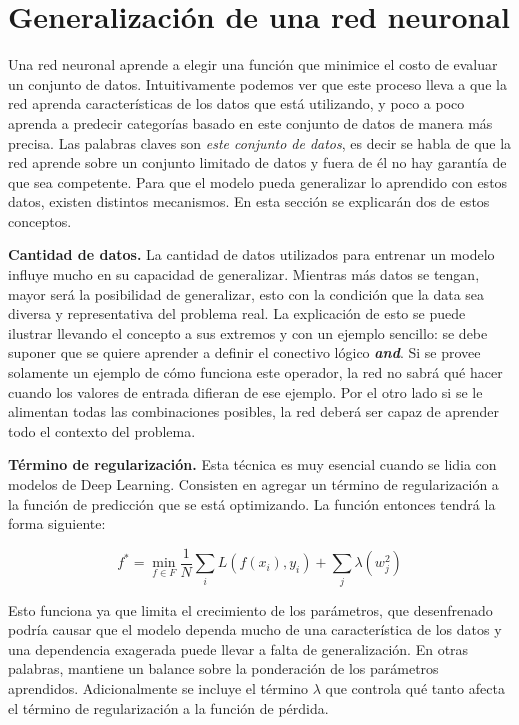 \section{Generalización de una red neuronal}

Una red neuronal aprende a elegir una función que minimice el costo de evaluar un conjunto de datos. Intuitivamente podemos ver que este proceso lleva a que la red aprenda características de los datos que está utilizando, y poco a poco aprenda a predecir categorías basado en este conjunto de datos de manera más precisa. Las palabras claves son \textit{este conjunto de datos}, es decir se habla de que la red aprende sobre un conjunto limitado de datos y fuera de él no hay garantía de que sea competente. Para que el modelo pueda generalizar lo aprendido con estos datos, existen distintos mecanismos. En esta sección se explicarán dos de estos conceptos.

\textbf{Cantidad de datos.} La cantidad de datos utilizados para entrenar un modelo influye mucho en su capacidad de generalizar. Mientras más datos se tengan, mayor será la posibilidad de generalizar, esto con la condición que la data sea diversa y representativa del problema real. La explicación de esto se puede ilustrar llevando el concepto a sus extremos y con un ejemplo sencillo: se debe suponer que se quiere aprender a definir el conectivo lógico \textbf{\textit{and}}. Si se provee solamente un ejemplo de cómo funciona este operador, la red no sabrá qué hacer cuando los valores de entrada difieran de ese ejemplo. Por el otro lado si se le alimentan todas las combinaciones posibles, la red deberá ser capaz de aprender todo el contexto del problema.

\textbf{Término de regularización.} Esta técnica es muy esencial cuando se lidia con modelos de Deep Learning. Consisten en agregar un término de regularización a la función de predicción que se está optimizando. La función entonces tendrá la forma siguiente: %

\[ f^* = \min_{f \in F} \frac{1}{N} \sum_{i} L(f(x_i), y_i) + \sum_{j} \lambda(w_j^2) \]

Esto funciona ya que limita el crecimiento de los parámetros, que desenfrenado podría causar que el modelo dependa mucho de una característica de los datos y una dependencia exagerada puede llevar a falta de generalización. En otras palabras, mantiene un balance sobre la ponderación de los parámetros aprendidos. Adicionalmente se incluye el término $\lambda$ que controla qué tanto afecta el término de regularización a la función de pérdida.

